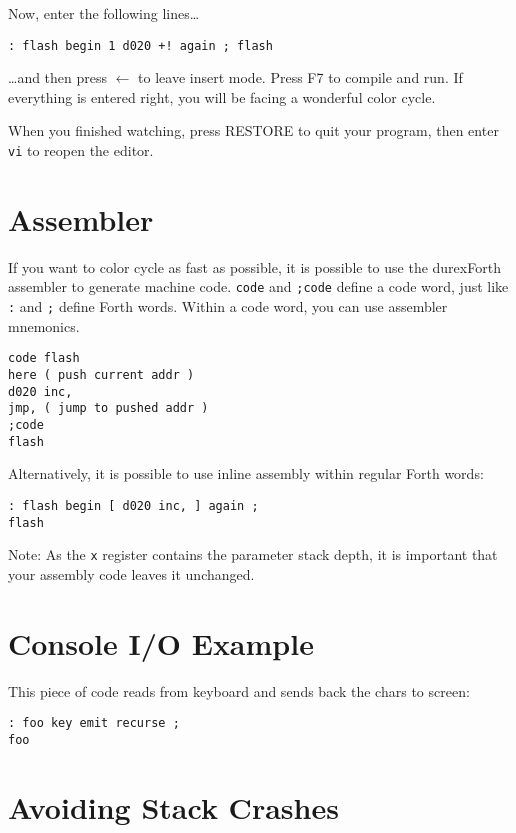 Now, enter the following lines\ldots

\begin{verbatim}
: flash begin 1 d020 +! again ; flash
\end{verbatim}

\ldots and then press $\leftarrow$ to leave insert mode.
Press \textsc{F7} to compile and run. If everything is entered right, you will be facing a wonderful color cycle.

When you finished watching, press \textsc{RESTORE} to quit your program, then enter \texttt{vi} to reopen the editor.

\section{Assembler}

If you want to color cycle as fast as possible, it is possible to use the durexForth assembler to generate machine code. \texttt{code} and \texttt{;code} define a code word, just like \texttt{:} and \texttt{;} define Forth words. Within a code word, you can use assembler mnemonics. 

\begin{verbatim}
code flash
here ( push current addr )
d020 inc,
jmp, ( jump to pushed addr )
;code
flash
\end{verbatim}

Alternatively, it is possible to use inline assembly within regular Forth words:

\begin{verbatim}
: flash begin [ d020 inc, ] again ;
flash
\end{verbatim}

Note: As the \texttt{x} register contains the parameter stack depth, it is important that your assembly code leaves it unchanged.

\section{Console I/O Example}

This piece of code reads from keyboard and sends back the chars to screen:

\begin{verbatim}
: foo key emit recurse ;
foo
\end{verbatim}

\section{Avoiding Stack Crashes}

